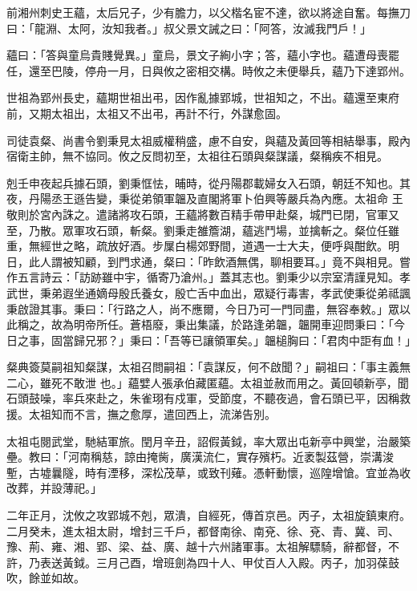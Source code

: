 \begin{pinyinscope}
 前湘州刺史王蘊，太后兄子，少有膽力，以父楷名宦不達，欲以將途自奮。每撫刀曰：「龍淵、太阿，汝知我者。」叔父景文誡之曰：「阿答，汝滅我門戶！」



 蘊曰：「答與童烏貴賤覺異。」童烏，景文子絢小字；答，蘊小字也。蘊遭母喪罷任，還至巴陵，停舟一月，日與攸之密相交構。時攸之未便舉兵，蘊乃下達郢州。



 世祖為郢州長史，蘊期世祖出弔，因作亂據郢城，世祖知之，不出。蘊還至東府前，又期太祖出，太祖又不出弔，再計不行，外謀愈固。



 司徒袁粲、尚書令劉秉見太祖威權稍盛，慮不自安，與蘊及黃回等相結舉事，殿內宿衛主帥，無不協同。攸之反問初至，太祖往石頭與粲謀議，粲稱疾不相見。



 剋壬申夜起兵據石頭，劉秉恇怯，晡時，從丹陽郡載婦女入石頭，朝廷不知也。其夜，丹陽丞王遜告變，秉從弟領軍韞及直閣將軍卜伯興等嚴兵為內應。太祖命
 王敬則於宮內誅之。遣諸將攻石頭，王蘊將數百精手帶甲赴粲，城門已閉，官軍又至，乃散。眾軍攻石頭，斬粲。劉秉走雒簷湖，蘊逃鬥場，並擒斬之。粲位任雖重，無經世之略，疏放好酒。步屟白楊郊野間，道遇一士大夫，便呼與酣飲。明日，此人謂被知顧，到門求通，粲曰：「昨飲酒無偶，聊相要耳。」竟不與相見。嘗作五言詩云：「訪跡雖中宇，循寄乃滄州。」蓋其志也。劉秉少以宗室清謹見知。孝武世，秉弟遐坐通嫡母殷氏養女，殷亡舌中血出，眾疑行毒害，孝武使秉從弟祗諷秉啟證其事。秉曰：「行路之人，尚不應爾，今日乃可一門同盡，無容奉敕。」眾以此稱之，故為明帝所任。蒼梧廢，秉出集議，於路逢弟韞，韞開車迎問秉曰：「今日之事，固當歸兄邪？」秉曰：「吾等已讓領軍矣。」韞槌胸曰：「君肉中詎有血！」



 粲典簽莫嗣祖知粲謀，太祖召問嗣祖：「袁謀反，何不啟聞？」嗣祖曰：「事主義無二心，雖死不敢泄
 也。」蘊嬖人張承伯藏匿蘊。太祖並赦而用之。黃回頓新亭，聞石頭鼓噪，率兵來赴之，朱雀珝有戍軍，受節度，不聽夜過，會石頭已平，因稱救援。太祖知而不言，撫之愈厚，遣回西上，流涕告別。



 太祖屯閱武堂，馳結軍旅。閏月辛丑，詔假黃鉞，率大眾出屯新亭中興堂，治嚴築壘。教曰：「河南稱慈，諒由掩胔，廣漢流仁，實存殯朽。近袤製茲營，崇溝浚塹，古墟曩隧，時有湮移，深松茂草，或致刊薙。憑軒動懷，巡隍增愴。宜並為收改葬，并設薄祀。」



 二年正月，沈攸之攻郢城不剋，眾潰，自經死，傳首京邑。丙子，太祖旋鎮東府。二月癸未，進太祖太尉，增封三千戶，都督南徐、南兗、徐、兗、青、冀、司、豫、荊、雍、湘、郢、梁、益、廣、越十六州諸軍事。太祖解驃騎，辭都督，不許，乃表送黃鉞。三月己酉，增班劍為四十人、甲仗百人入殿。丙子，加羽葆鼓吹，餘並如故。




\end{pinyinscope}
